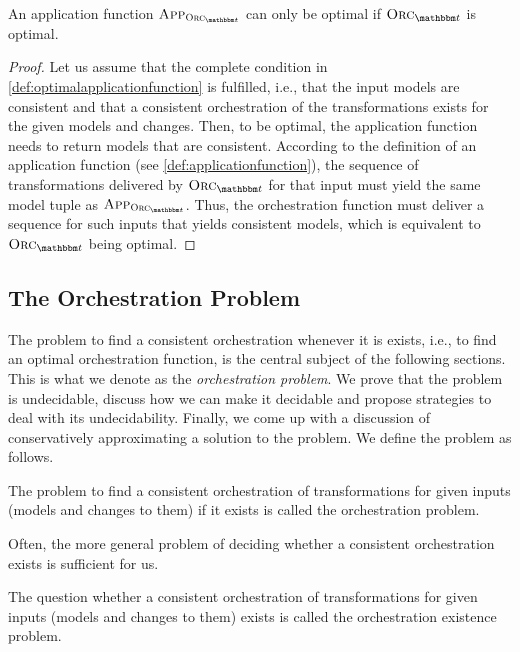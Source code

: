 \begin{lemma}
    \label{lemma:optimalapplicationfunction}
    An application function $\appfunction{\orcfunction{\transformationset{T}}}$ can only be optimal if $\orcfunction{\transformationset{T}}$ is optimal.
\end{lemma}
\begin{proof}
    Let us assume that the complete condition in \autoref{def:optimalapplicationfunction} is fulfilled, i.e., that the input models are consistent and that a consistent orchestration of the transformations exists for the given models and changes.
    Then, to be optimal, the application function needs to return models that are consistent.
    According to the definition of an application function (see \autoref{def:applicationfunction}), the sequence of transformations delivered by $\orcfunction{\transformationset{T}}$ for that input must yield the same model tuple as $\appfunction{\orcfunction{\transformationset{T}}}$.
    Thus, the orchestration function must deliver a sequence for such inputs that yields consistent models, which is equivalent to $\orcfunction{\transformationset{T}}$ being optimal.
\end{proof}


\subsection{The Orchestration Problem}

The problem to find a consistent orchestration whenever it is exists, i.e., to find an optimal orchestration function, is the central subject of the following sections.
This is what we denote as the \emph{orchestration problem}.
We prove that the problem is undecidable, discuss how we can make it decidable and propose strategies to deal with its undecidability.
Finally, we come up with a discussion of conservatively approximating a solution to the problem.
We define the problem as follows.
\begin{definition}
    \label{def:orchestrationproblem}
    The problem to find a consistent orchestration of transformations for given inputs (models and changes to them) if it exists is called the orchestration problem.
\end{definition}

Often, the more general problem of deciding whether a consistent orchestration exists is sufficient for us.
\begin{definition}
    \label{def:orchestrationexistenceproblem}
    The question whether a consistent orchestration of transformations for given inputs (models and changes to them) exists is called the orchestration existence problem.
\end{definition}


